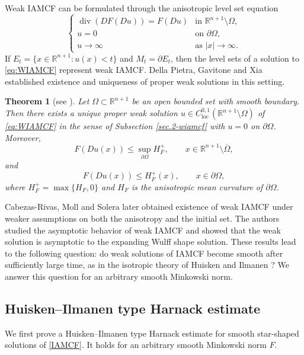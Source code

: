 \documentclass[10pt,a4paper]{amsart}
\newtheorem{theorem}[proposition]{Theorem}
\numberwithin{equation}{section}
\begin{document}
	Weak IAMCF can be formulated through the anisotropic level set equation
	\begin{equation}
	\label{eq:WIAMCF}
	\begin{cases}
		\operatorname{div}(DF(Du))=F(Du) & \text{in } \mathbb{R}^{n+1}\setminus\Omega, \\
		u=0 & \text{on } \partial\Omega, \\
		u\to\infty & \text{as } |x|\to\infty.
	\end{cases}
	\end{equation}
	If $E_t=\{x\in\mathbb{R}^{n+1}:u(x)<t\}$ and $M_t=\partial E_t$, then the level sets of a solution to \eqref{eq:WIAMCF} represent weak IAMCF. Della Pietra, Gavitone and Xia \cite{DGX23} established existence and uniqueness of proper weak solutions in this setting.
	
	\begin{theorem}[see {\cite[Theorem 1.1]{DGX23}}]
		\label{thmwiamcf}
		Let $\Omega\subset\mathbb{R}^{n+1}$ be an open bounded set with smooth boundary. Then there exists a unique proper weak solution $u\in C^{0,1}_{\mathrm{loc}}(\mathbb{R}^{n+1}\setminus \Omega)$ of \eqref{eq:WIAMCF} in the sense of Subsection \ref{sec.2-wiamcf} with $u=0$ on $\partial\Omega$. 
Moreover,
	\begin{equation*}
			F(Du(x))\leq \sup_{\partial\Omega}H_F^+, \qquad x\in \mathbb R^{n+1}\setminus\overline\Omega,
		\end{equation*}
		and
		\begin{equation*}
			F(Du(x))\leq H_F^+(x), \qquad x\in\partial\Omega,
		\end{equation*}
		where $H_F^+=\max\{H_F,0\}$ and $H_F$ is the anisotropic mean curvature of $\partial\Omega$.
	\end{theorem}
	
	Cabezas-Rivas, Moll and Solera \cite{CMS24} later obtained existence of weak IAMCF under weaker assumptions on both the anisotropy and the initial set. The authors \cite{GWZ26} studied the asymptotic behavior of weak IAMCF and showed that the weak solution is asymptotic to the expanding Wulff shape solution. These results lead to the following question: do weak solutions of IAMCF become smooth after sufficiently large time, as in the isotropic theory of Huisken and Ilmanen \cite{HI08}? We answer this question for an arbitrary smooth Minkowski norm.


	\subsection{Huisken--Ilmanen type Harnack estimate}
	\label{subsec:harnack-intro}
We first prove a Huisken--Ilmanen type Harnack estimate for smooth star-shaped solutions of \eqref{IAMCF}. It holds for an arbitrary smooth Minkowski norm $F$.
	
\end{document}
